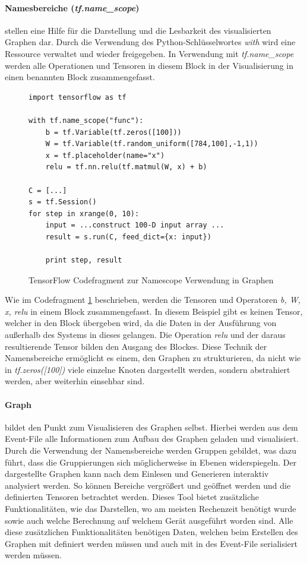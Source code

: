 \paragraph{Namesbereiche (\textit{tf.name\_scope})} stellen eine Hilfe für die Darstellung und die Lesbarkeit des visualisierten Graphen dar. 
Durch die Verwendung des Python-Schlüsselwortes \textit{with} wird eine Ressource verwaltet und wieder freigegeben. 
In Verwendung mit \textit{tf.name\_scope} werden alle Operationen und Tensoren in diesem Block in der Visualisierung in einen benannten Block zusammengefasst.
\begin{figure}[ht!]
\lstset{language=Python}
\begin{lstlisting}
import tensorflow as tf

with tf.name_scope("func"):
	b = tf.Variable(tf.zeros([100])) 
	W = tf.Variable(tf.random_uniform([784,100],-1,1)) 
	x = tf.placeholder(name="x") 
	relu = tf.nn.relu(tf.matmul(W, x) + b) 

C = [...] 
s = tf.Session()
for step in xrange(0, 10):
	input = ...construct 100-D input array ... 
	result = s.run(C, feed_dict={x: input}) 

	print step, result 
\end{lstlisting}

	\caption{TensorFlow Codefragment zur Namescope Verwendung in Graphen}
	\label{fig:NameScopeFragmentGraphDefinition}
\end{figure}
Wie im Codefragment \ref{fig:NameScopeFragmentGraphDefinition} beschrieben, werden die Tensoren und Operatoren \textit{b, W, x, relu} in einem Block zusammengefasst. 
In diesem Beispiel gibt es keinen Tensor, welcher in den Block übergeben wird, da die Daten in der Ausführung von außerhalb des Systems in dieses gelangen. 
Die Operation \textit{relu} und der daraus resultierende Tensor bilden den Ausgang des Blockes. 
Diese Technik der Namensbereiche ermöglicht es einem, den Graphen zu strukturieren, da nicht wie in \textit{tf.zeros([100])} viele einzelne Knoten dargestellt werden, sondern abstrahiert werden, aber weiterhin einsehbar sind.

\paragraph{Graph} bildet den Punkt zum Visualisieren des Graphen selbst. 
Hierbei werden aus dem Event-File alle Informationen zum Aufbau des Graphen geladen und visualisiert. 
Durch die Verwendung der Namensbereiche werden Gruppen gebildet, was dazu führt, dass die Gruppierungen sich möglicherweise in Ebenen widerspiegeln. 
Der dargestellte Graphen kann nach dem Einlesen und Generieren interaktiv analysiert werden. 
So können Bereiche vergrößert und geöffnet werden und die definierten Tensoren betrachtet werden. 
Dieses Tool bietet zusätzliche Funktionalitäten, wie das Darstellen, wo am meisten Rechenzeit benötigt wurde sowie auch welche Berechnung auf welchem Gerät ausgeführt worden sind. 
Alle diese zusätzlichen Funktionalitäten benötigen Daten, welchen beim Erstellen des Graphen mit definiert werden müssen und auch mit in des Event-File serialisiert werden müssen. 

